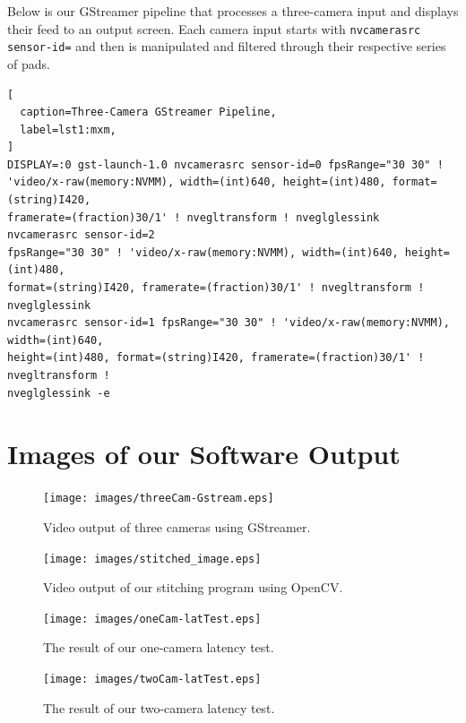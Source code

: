 \documentclass[letterpaper,10pt,serif,draftclsnofoot,onecolumn,compsoc,titlepage]{IEEEtran}
\begin{document}
Below is our GStreamer pipeline that processes a three-camera input and displays 
their feed to an output screen. Each camera input starts with 
\texttt{nvcamerasrc sensor-id=} and then is manipulated and filtered through 
their respective series of pads. \\

\begin{lstlisting}[
  caption=Three-Camera GStreamer Pipeline,
  label=lst1:mxm,
]
DISPLAY=:0 gst-launch-1.0 nvcamerasrc sensor-id=0 fpsRange="30 30" ! 
'video/x-raw(memory:NVMM), width=(int)640, height=(int)480, format=(string)I420, 
framerate=(fraction)30/1' ! nvegltransform ! nveglglessink  nvcamerasrc sensor-id=2 
fpsRange="30 30" ! 'video/x-raw(memory:NVMM), width=(int)640, height=(int)480, 
format=(string)I420, framerate=(fraction)30/1' ! nvegltransform ! nveglglessink 
nvcamerasrc sensor-id=1 fpsRange="30 30" ! 'video/x-raw(memory:NVMM), width=(int)640, 
height=(int)480, format=(string)I420, framerate=(fraction)30/1' ! nvegltransform ! 
nveglglessink -e
\end{lstlisting}

\section{Images of our Software Output}

\begin{figure}[H]
	\centering
	\label{fig:Video output of three cameras using GStreamer.}
	\texttt{[image: images/threeCam-Gstream.eps]}
	\caption{Video output of three cameras using GStreamer. \label{overflow}}
\end{figure}

\begin{figure}[H]
	\centering
	\label{fig:Video output of our stitching program using OpenCV.}
	\texttt{[image: images/stitched\_image.eps]}
	\caption{Video output of our stitching program using OpenCV. \label{overflow}}
\end{figure}

\begin{figure}[H]
	\centering
	\label{fig:The result of our one-camera latency test.}
	\texttt{[image: images/oneCam-latTest.eps]}
	\caption{The result of our one-camera latency test. \label{overflow}}
\end{figure}

\begin{figure}[H]
	\centering
	\label{fig:The result of our two-camera latency test.}
	\texttt{[image: images/twoCam-latTest.eps]}
	\caption{The result of our two-camera latency test. \label{overflow}}
\end{figure}
\end{document}
